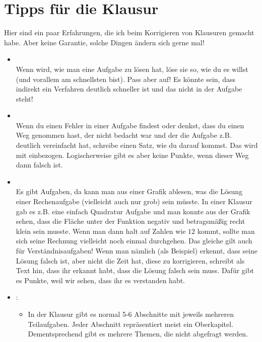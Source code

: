 
\newpage
\section{Tipps für die Klausur}

Hier sind ein paar Erfahrungen, die ich beim Korrigieren von Klausuren gemacht habe. Aber keine Garantie, solche Dingen ändern sich gerne mal!

\begin{itemize}
	\item {} \\		
	Wenn  wird, wie man eine Aufgabe zu lösen hat, löse sie so, wie du es willst (und vorallem am schnellsten bist). Pass aber auf! Es könnte sein, dass indirekt ein Verfahren deutlich schneller ist und das nicht in der Aufgabe steht!
	
	\item {} \\		
	Wenn du einen Fehler in einer Aufgabe findest oder denkst, dass du einen Weg genommen hast, der nicht bedacht war und der die Aufgabe z.B. deutlich vereinfacht hat, schreibe einen Satz, wie du darauf kommst. Das wird mit einbezogen. Logischerweise gibt es aber keine Punkte, wenn dieser Weg dann falsch ist.
	
	\item {} \\
	Es gibt Aufgaben, da kann man aus einer Grafik ablesen, was die Lösung einer Rechenaufgabe (vielleicht auch nur grob) sein müsste. In einer Klausur gab es z.B. eine einfach Quadratur Aufgabe und man konnte aus der Grafik sehen, dass die Fläche unter der Funktion negativ und betragsmäßig recht klein sein musste. Wenn man dann halt auf Zahlen wie $12$ kommt, sollte man sich seine Rechnung vielleicht noch einmal durchgehen. Das gleiche gilt auch für Verständnisaufgaben! Wenn man nämlich (als Beispiel) erkennt, dass seine Lösung falsch ist, aber nicht die Zeit hat, diese zu korrigieren, schreibt als Text hin, dass ihr erkannt habt, dass die Lösung falsch sein muss. Dafür gibt es Punkte, weil wir sehen, dass ihr es verstanden habt.
	
	
	\item {}:
	\begin{itemize}
		\item In der Klausur gibt es normal 5-6 Abschnitte mit jeweils mehreren Teilaufgaben. Jeder Abschnitt repräsentiert meist ein Oberkapitel. Dementsprechend gibt es mehrere Themen, die nicht abgefragt werden.
		

\end{itemize}
\end{itemize}
